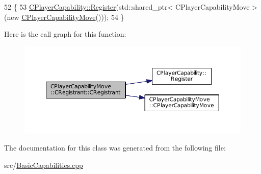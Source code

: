 \begin{DoxyCode}
52                                              \{
53     \hyperlink{classCPlayerCapability_a7e298018dcde2684451add3cfff065f7}{CPlayerCapability::Register}(std::shared\_ptr< CPlayerCapabilityMove >(\textcolor{keyword}{new} 
      \hyperlink{classCPlayerCapabilityMove_a6bfe72663b6b5fc708d23373dc293ec7}{CPlayerCapabilityMove}()));   
54 \}
\end{DoxyCode}
Here is the call graph for this function\+:
\nopagebreak
\begin{figure}[H]
\begin{center}
\leavevmode
\includegraphics[width=350pt]{classCPlayerCapabilityMove_1_1CRegistrant_a9ee42fd2028701745555195a2e35922b_cgraph}
\end{center}
\end{figure}


The documentation for this class was generated from the following file\+:\begin{DoxyCompactItemize}
\item 
src/\hyperlink{BasicCapabilities_8cpp}{Basic\+Capabilities.\+cpp}\end{DoxyCompactItemize}
